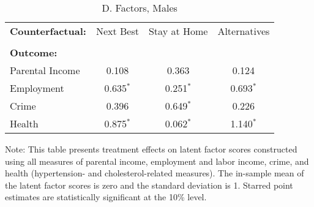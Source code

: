 \begin{table}[H] 
\begin{threeparttable}
\caption{D. Factors, Males}
\centering 
\begin{tabular}{lccc} \toprule
\textbf{Counterfactual:} & Next Best & Stay at Home & Alternatives \\ \\

\textbf{Outcome:} &   \\ 
Parental Income   &  0.108        & 0.363         & 0.124      \\ 
Employment         &  0.635$^*$   & 0.251$^*$  & 0.693$^*$ \\ 
Crime                    & 0.396          & 0.649$^*$   & 0.226        \\ 
Health                   &  0.875$^*$  & 0.062$^*$  & 1.140$^*$ \\ \bottomrule
\end{tabular}
\begin{tablenotes}
\footnotesize
\item Note: This table presents treatment effects on latent factor scores constructed using all measures of parental income, employment and labor income, crime, and health (hypertension- and cholesterol-related measures). The in-sample mean of the latent factor scores is zero and the standard deviation is 1. Starred point estimates are statistically significant at the 10\% level. 
\end{tablenotes}
\end{threeparttable}
\end{table}

